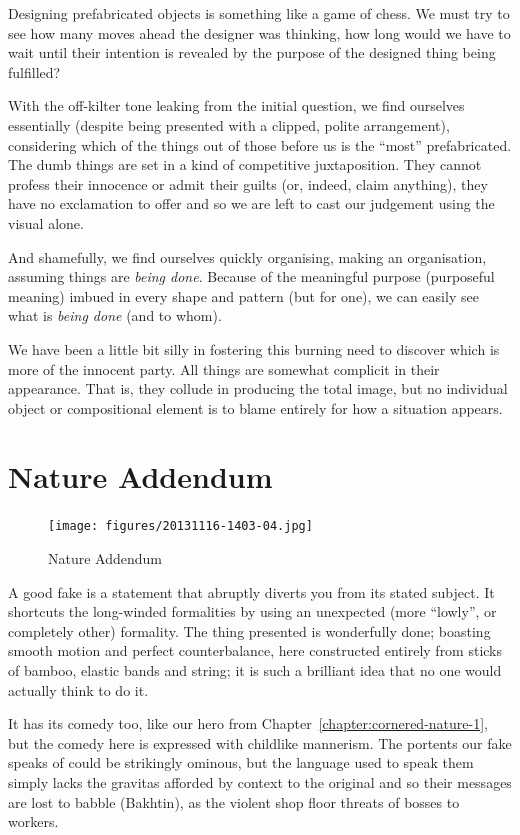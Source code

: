 \documentclass{book}
\begin{document}
Designing prefabricated objects is something like a game of chess.  We must try
to see how many moves ahead the designer was thinking, how long would we have
to wait until their intention is revealed by the purpose of the designed thing
being fulfilled?

With the off-kilter tone leaking from the initial question, we find ourselves
essentially (despite being presented with a clipped, polite arrangement),
considering which of the things out of those before us is the ``most''
prefabricated. The dumb things are set in a kind of competitive juxtaposition.
They cannot profess their innocence or admit their guilts (or, indeed, claim
anything), they have no exclamation to offer and so we are left to cast our
judgement using the visual alone.

And shamefully, we find ourselves quickly organising, making an organisation,
assuming things are \emph{being done}. Because of the meaningful purpose
(purposeful meaning) imbued in every shape and pattern (but for one), we can
easily see what is \emph{being done} (and to whom).

We have been a little bit silly in fostering this burning need to discover
which is more of the innocent party. All things are somewhat complicit in
their appearance. That is, they collude in producing the total image, but no
individual object or compositional element is to blame entirely for how a
situation appears.

\chapter{Nature Addendum}

\begin{figure}
\centering
\texttt{[image: figures/20131116-1403-04.jpg]}
\caption{Nature Addendum}
\end{figure}

A good fake is a statement that abruptly diverts you from its stated subject.
It shortcuts the long-winded formalities by using an unexpected (more
``lowly'', or completely other) formality. The thing presented is wonderfully
done; boasting smooth motion and perfect counterbalance, here constructed
entirely from sticks of bamboo, elastic bands and string; it is such a
brilliant idea that no one would actually think to do it.

It has its comedy too, like our hero from
Chapter~\ref{chapter:cornered-nature-1}, but the comedy here is expressed with
childlike mannerism. The portents our fake speaks of could be strikingly
ominous, but the language used to speak them simply lacks the gravitas afforded
by context to the original and so their messages are lost to babble (Bakhtin),
as the violent shop floor threats of bosses to workers.
\end{document}
